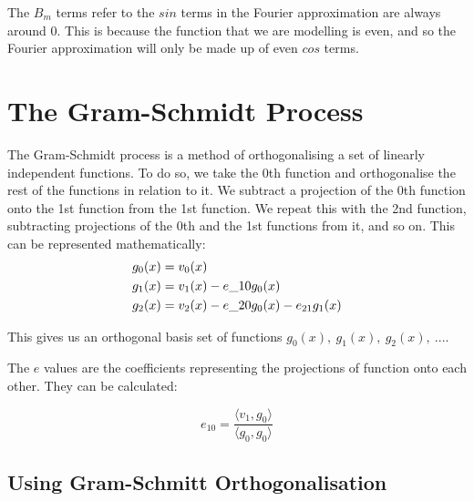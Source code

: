 \documentclass{article}
\begin{document}
The $B_m$ terms refer to the $sin$ terms in the Fourier approximation are always around $0$. This is because the function that we are modelling is even, and so the Fourier approximation will only be made up of even $cos$ terms.  



















\section{The Gram-Schmidt Process}



The Gram-Schmidt process is a method of orthogonalising a set of linearly independent functions. To do so, we take the 0th function and orthogonalise the rest of the functions in relation to it. We subtract a projection of the 0th function onto the 1st function from the 1st function. We repeat this with the 2nd function, subtracting projections of the 0th and the 1st functions from it, and so on. This can be represented mathematically:
$$
\begin{aligned}
g_0(x) &= v_0(x) \\
g_1(x) &= v_1(x) -e\_{10}g_0(x) \\
g_2(x) &= v_2(x) -e\_{20}g_0(x) -e_{21}g_1(x) \\
\end{aligned} \\
$$

This gives us an orthogonal basis set of functions $ g_0(x),\ g_1(x),\ g_2(x),\ ...$.

The $e$ values are the coefficients representing the projections of function onto each other. They can be calculated:

$$ e_{10} =  \frac{\langle v_1, g_0 \rangle}{\langle g_0, g_0 \rangle} $$

















\subsection{Using Gram-Schmitt Orthogonalisation}
\end{document}
